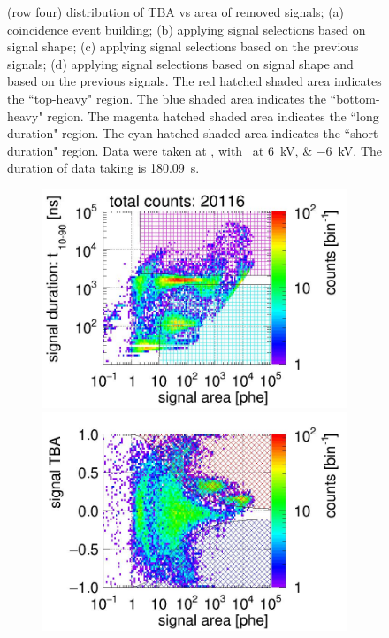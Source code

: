 \begin{landscape}
\begin{figure}[!p]
{(row four) distribution of TBA vs area of removed signals;
			(a) coincidence event building; 
			(b) applying signal selections based on signal shape;
			(c) applying signal selections based on the previous signals;
			(d) applying signal selections based on signal shape and based on the previous signals.
		The red hatched shaded area indicates the ``top-heavy" region.
	The blue shaded area indicates the ``bottom-heavy" region.
	The magenta hatched shaded area indicates the ``long duration" region.
The cyan hatched shaded area indicates the ``short duration" region.
Data were taken at , with \opvtvb\ at \SIlist{+6;-6}{kV}. The duration of data taking is \SI{180.09}{\s}.
		}
		\label{fig:signal selection dv 12}
	\end{figure}
\end{landscape}
\begin{landscape}%
	\begin{figure}[!p]
		\centering
		\begin{subfigure}[t]{0.33\textwidth} %
			\centering
			\includegraphics[width=\figurewidth,clip,trim={0 98 0 0}]{Figures/GasTest/CutsValid/res64769/pdpa22Vecfig64769.jpg}
			\includegraphics[width=\figurewidth,clip,trim={0 0 0 40}]{Figures/GasTest/CutsValid/res64769/tbapa22Vecfig64769.jpg}

\end{subfigure}
\end{figure}
\end{landscape}
